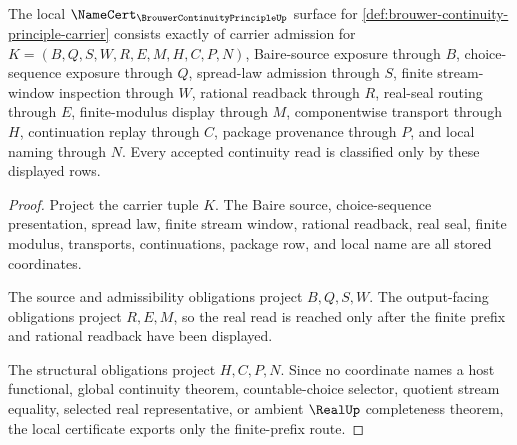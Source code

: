 \begin{theorem}
\label{thm:brouwer-continuity-principle-namecert-obligations}
The local $\NameCert_{\BrouwerContinuityPrincipleUp}$ surface for \autoref{def:brouwer-continuity-principle-carrier} consists exactly of carrier admission for $K=(B,Q,S,W,R,E,M,H,C,P,N)$, Baire-source exposure through $B$, choice-sequence exposure through $Q$, spread-law admission through $S$, finite stream-window inspection through $W$, rational readback through $R$, real-seal routing through $E$, finite-modulus display through $M$, componentwise transport through $H$, continuation replay through $C$, package provenance through $P$, and local naming through $N$. Every accepted continuity read is classified only by these displayed rows.
\end{theorem}
\begin{proof}
Project the carrier tuple $K$. The Baire source, choice-sequence presentation, spread law, finite stream window, rational readback, real seal, finite modulus, transports, continuations, package row, and local name are all stored coordinates.

The source and admissibility obligations project $B,Q,S,W$. The output-facing obligations project $R,E,M$, so the real read is reached only after the finite prefix and rational readback have been displayed.

The structural obligations project $H,C,P,N$. Since no coordinate names a host functional, global continuity theorem, countable-choice selector, quotient stream equality, selected real representative, or ambient $\RealUp$ completeness theorem, the local certificate exports only the finite-prefix route.
\end{proof}

